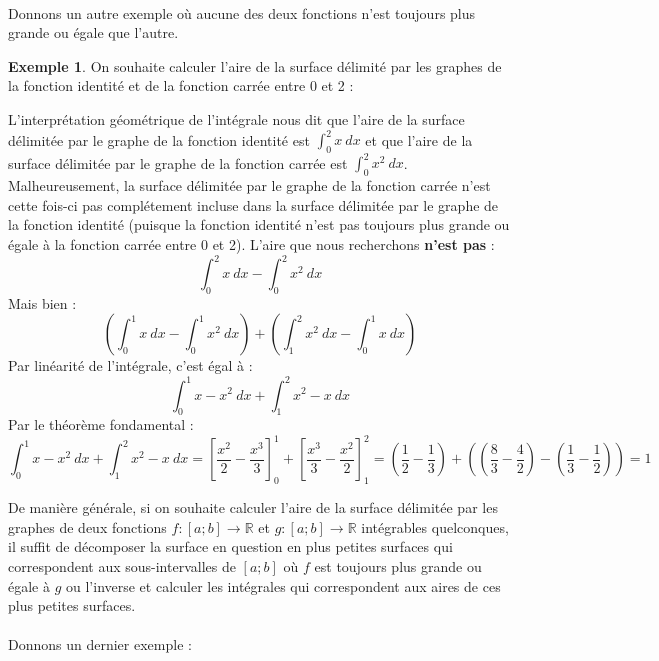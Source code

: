 \documentclass[a4paper,fontsize=13pt]{scrreprt}
\theoremstyle{plain}
\theoremstyle{definition}
\newtheorem{exe}[subsection]{Exemple}
\newcommand{\rr}{\mathbb{R}}
\newcommand {\grille}{\draw[help lines] (\xmin,\ymin) grid (\xmax,\ymax);}
\newcommand {\axes} {
	\draw[thick, ->] (\xmin,0) -- (\xmax+1,0);
	\draw[thick, ->] (0,\ymin) -- (0,\ymax+1);
	\draw (0,\ymax+0.5) node [left] {$y$};
	\draw (\xmax+0.5, 0) node [below] {$x$};
	\draw[thick] (-0.15,1)--(0.15,1) (1,-0.15)--(1,0.15);
	\draw (0,1)node[left]{$1$} (1,0)node[below]{$1$};
}
\begin{document}
~\\
Donnons un autre exemple où aucune des deux fonctions n'est toujours plus grande ou égale que l'autre.
\begin{exe}
On souhaite calculer l'aire de la surface délimité par les graphes de la fonction identité et de la fonction carrée entre 0 et 2 :
\begin{center}
\end{center}
L'interprétation géométrique de l'intégrale nous dit que l'aire de la surface délimitée par le graphe de la fonction identité est $\int_0^2 x~dx$ et que l'aire de la surface délimitée par le graphe de la fonction carrée est $\int_0^2 x^2~dx$. Malheureusement, la surface délimitée par le graphe de la fonction carrée n'est cette fois-ci pas complétement incluse dans la surface délimitée par le graphe de la fonction identité (puisque la fonction identité n'est pas toujours plus grande ou égale à la fonction carrée entre 0 et 2). L'aire que nous recherchons \textbf{n'est pas} :
$$\int_0^2 x~dx - \int_0^2 x^2~dx$$
Mais bien :
$$(\int_0^1 x~dx - \int_0^1 x^2~dx) + (\int_1^2 x^2~dx - \int_0^1 x~dx) $$
Par linéarité de l'intégrale, c'est égal à :
$$\int_0^1 x-x^2~dx + \int_1^2 x^2 -x~dx$$
Par le théorème fondamental :
$$\int_0^1 x-x^2~dx + \int_1^2 x^2 -x~dx = [\frac{x^2}{2} - \frac{x^3}{3}]_0^1 +  [\frac{x^3}{3} - \frac{x^2}{2}]_1^2= (\frac{1}{2}-\frac{1}{3}) + ((\frac{8}{3} - \frac{4}{2})-(\frac{1}{3} - \frac{1}{2}))=1$$
\end{exe}
De manière générale, si on souhaite calculer l'aire de la surface délimitée par les graphes de deux fonctions $f : [a;b] \to \rr$ et $g : [a;b] \to  \rr$ intégrables quelconques, il suffit de décomposer la surface en question en plus petites surfaces qui correspondent aux sous-intervalles de $[a;b]$ où $f$ est toujours plus grande ou égale à $g$ ou l'inverse et calculer les intégrales qui correspondent aux aires de ces plus petites surfaces. \\
~\\
Donnons un dernier exemple :
\end{document}
